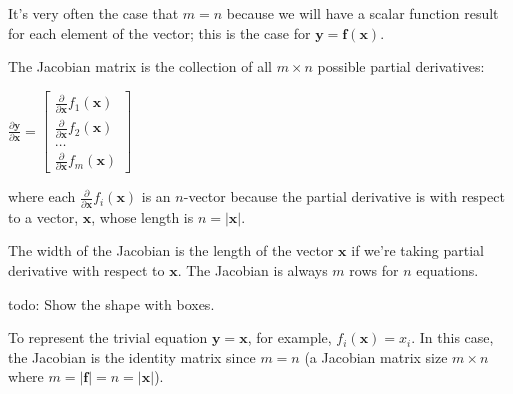 \documentclass[11pt]{article}
\begin{document}
It's very often the case that $m=n$ because we will have a scalar function result for each element of the vector; this is the case for $\mathbf{y} = \mathbf{f}(\mathbf{x})$.

The Jacobian matrix is the collection of all $m \times n$ possible partial derivatives:

$
\frac{\partial \mathbf{y}}{\partial \mathbf{x}} = \begin{bmatrix}
\frac{\partial}{\partial \mathbf{x}} f_1(\mathbf{x}) \\
\frac{\partial}{\partial \mathbf{x}} f_2(\mathbf{x})\\
\ldots\\
\frac{\partial}{\partial \mathbf{x}} f_m(\mathbf{x})
\end{bmatrix}
$

where each $\frac{\partial}{\partial \mathbf{x}} f_i(\mathbf{x})$ is an $n$-vector because the partial derivative is with respect to a vector, $\mathbf{x}$, whose length is $n = |\mathbf{x}|$.

The width of the Jacobian is the length of the vector $\mathbf{x}$ if we're taking partial derivative with respect to $\mathbf{x}$.  The Jacobian is always $m$ rows for $n$ equations.

todo: Show the shape with boxes.  

To represent the trivial equation $\mathbf{y} = \mathbf{x}$, for example, $f_i(\mathbf{x}) = x_i$. In this case, the Jacobian is the identity matrix since $m=n$ (a Jacobian matrix size $m \times n$ where $m = |\mathbf{f}| = n = |\mathbf{x}|$).
\end{document}

